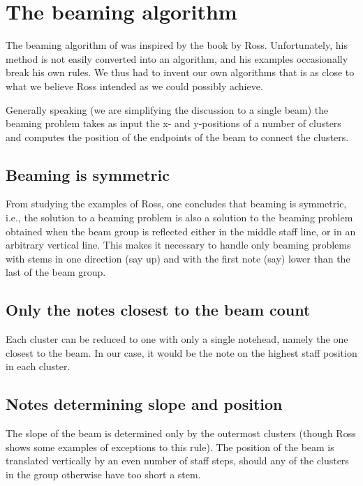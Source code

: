 \chapter{The beaming algorithm}

The beaming algorithm of \sysname{} was inspired by the book by Ross.
Unfortunately, his method is not easily converted into an algorithm,
and his examples occasionally break his own rules.  We thus had to
invent our own algorithms that is as close to what we believe Ross
intended as we could possibly achieve. 

Generally speaking (we are simplifying the discussion to a single
beam) the beaming problem takes as input the x- and y-positions of a
number of clusters and computes the position of the endpoints of the
beam to connect the clusters. 

\section{Beaming is symmetric}

From studying the examples of Ross, one concludes that beaming
is symmetric, i.e., the solution to a beaming problem is also a
solution to the beaming problem obtained when the beam group is
reflected either in the middle staff line, or in an arbitrary vertical
line.  This makes it necessary to handle only beaming problems with
stems in one direction (say up) and with the first note (say) lower
than the last of the beam group. 

\section{Only the notes closest to the beam count}

Each cluster can be reduced to one with only a single notehead, namely
the one closest to the beam.  In our case, it would be the note on the
highest staff position in each cluster.

\section{Notes determining slope and position}

The slope of the beam is determined only by the outermost clusters
(though Ross shows some examples of exceptions to this rule).  The
position of the beam is translated vertically by an even number of
staff steps, should any of the clusters in the group otherwise have
too short a stem. 

